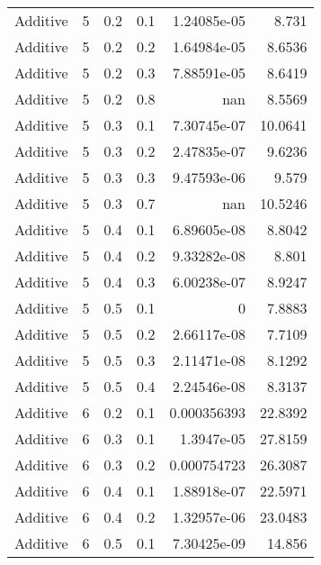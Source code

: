 \documentclass{article}
\begin{document}
\begin{longtable}[H]{lrrrrr}
 Additive       &       5 &   0.2 &            0.1 &   1.24085e-05 &          8.731  \\
 Additive       &       5 &   0.2 &            0.2 &   1.64984e-05 &          8.6536 \\
 Additive       &       5 &   0.2 &            0.3 &   7.88591e-05 &          8.6419 \\
 Additive       &       5 &   0.2 &            0.8 & nan           &          8.5569 \\
 Additive       &       5 &   0.3 &            0.1 &   7.30745e-07 &         10.0641 \\
 Additive       &       5 &   0.3 &            0.2 &   2.47835e-07 &          9.6236 \\
 Additive       &       5 &   0.3 &            0.3 &   9.47593e-06 &          9.579  \\
 Additive       &       5 &   0.3 &            0.7 & nan           &         10.5246 \\
 Additive       &       5 &   0.4 &            0.1 &   6.89605e-08 &          8.8042 \\
 Additive       &       5 &   0.4 &            0.2 &   9.33282e-08 &          8.801  \\
 Additive       &       5 &   0.4 &            0.3 &   6.00238e-07 &          8.9247 \\
 Additive       &       5 &   0.5 &            0.1 &   0           &          7.8883 \\
 Additive       &       5 &   0.5 &            0.2 &   2.66117e-08 &          7.7109 \\
 Additive       &       5 &   0.5 &            0.3 &   2.11471e-08 &          8.1292 \\
 Additive       &       5 &   0.5 &            0.4 &   2.24546e-08 &          8.3137 \\
 Additive       &       6 &   0.2 &            0.1 &   0.000356393 &         22.8392 \\
 Additive       &       6 &   0.3 &            0.1 &   1.3947e-05  &         27.8159 \\
 Additive       &       6 &   0.3 &            0.2 &   0.000754723 &         26.3087 \\
 Additive       &       6 &   0.4 &            0.1 &   1.88918e-07 &         22.5971 \\
 Additive       &       6 &   0.4 &            0.2 &   1.32957e-06 &         23.0483 \\
 Additive       &       6 &   0.5 &            0.1 &   7.30425e-09 &         14.856  \\

\end{longtable}
\end{document}
